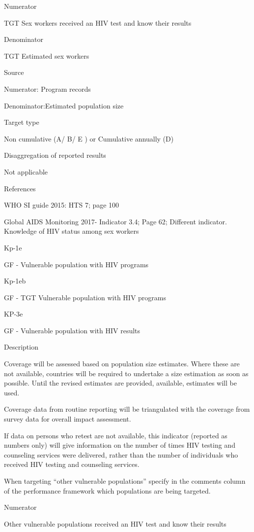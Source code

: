 \documentclass[]{book}
\begin{document}
Numerator

TGT Sex workers received an HIV test and know their results

Denominator

TGT Estimated sex workers

Source

Numerator: Program records

Denominator:Estimated population size

Target type

Non cumulative (A/ B/ E ) or Cumulative annually (D)

Disaggregation of reported results

Not applicable

References

WHO SI guide 2015: HTS 7; page 100

Global AIDS Monitoring 2017- Indicator 3.4; Page 62; Different indicator.
Knowledge of HIV status among sex workers

Kp-1e

GF - Vulnerable population with HIV programs

Kp-1eb

GF - TGT Vulnerable population with HIV programs

KP-3e

GF - Vulnerable population with HIV results

Description

Coverage will be assessed based on population size estimates. Where these are not available, countries will be required to undertake a size estimation as soon as possible. Until the revised estimates are provided, available, estimates will be used.

Coverage data from routine reporting will be triangulated with the coverage from survey data for overall impact assessment.

If data on persons who retest are not available, this indicator (reported as numbers only) will give information on the number of times HIV testing and counseling services were delivered, rather than the number of individuals who received HIV testing and counseling services.

When targeting ``other vulnerable populations'' specify in the comments column of the performance framework which populations are being targeted.

Numerator

Other vulnerable populations received an HIV test and know their results
\end{document}
